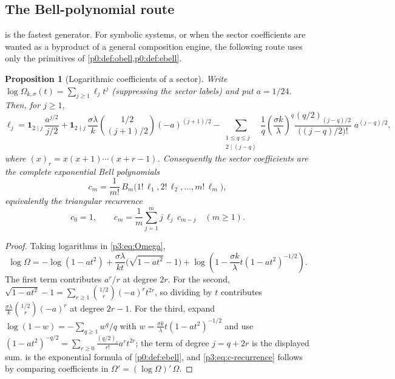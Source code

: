 \documentclass[11pt,a4paper,oneside]{book}
\theoremstyle{plain}
\newtheorem{proposition}[theorem]{Proposition}
\theoremstyle{definition}
\theoremstyle{remark}
\newcommand{\EB}{B}
\begin{document}
\subsection{The Bell-polynomial route}

 is the fastest generator. For symbolic systems, or when the sector
coefficients are wanted as a byproduct of a general composition engine, the following route uses
only the primitives of \cref{p0:def:obell,p0:def:ebell}.

\begin{proposition}[Logarithmic coefficients of a sector]\label{p3:prop:ell}
Write $\log\Omega_{k,\sigma}(t)=\sum_{j\ge1}\ell_{j}t^{j}$ (suppressing the sector labels) and put
$a=1/24$. Then, for $j\ge1$,
\begin{equation}\label{p3:eq:ell}
 \ell_{j}
 =\mathbf 1_{2\mid j}\,\frac{a^{j/2}}{j/2}
 +\mathbf 1_{2\nmid j}\,\frac{\sigma\lambda}{k}
   \binom{1/2}{(j+1)/2}(-a)^{(j+1)/2}
 -\sum_{\substack{1\le q\le j\\ 2\mid (j-q)}}\frac1q
   \left(\frac{\sigma k}{\lambda}\right)^{\!q}
   \frac{(q/2)_{(j-q)/2}}{\bigl((j-q)/2\bigr)!}\;a^{(j-q)/2},
\end{equation}
where $(x)_{r}=x(x+1)\cdots(x+r-1)$. Consequently the sector coefficients are the complete
exponential Bell polynomials
\begin{equation}\label{p3:eq:c-bell}
 c_{m}=\frac1{m!}\,\EB_{m}\bigl(1!\,\ell_{1},2!\,\ell_{2},\dots,m!\,\ell_{m}\bigr),
\end{equation}
equivalently the triangular recurrence
\begin{equation}\label{p3:eq:c-recurrence}
 c_{0}=1,\qquad c_{m}=\frac1m\sum_{j=1}^{m}j\,\ell_{j}\,c_{m-j}\quad(m\ge1).
\end{equation}
\end{proposition}

\begin{proof}
Taking logarithms in \cref{p3:eq:Omega},
\[
\log\Omega=-\log(1-at^{2}) +\frac{\sigma\lambda}{kt}\bigl(\sqrt{1-at^{2}}-1\bigr)
+\log\!\left(1-\frac{\sigma k}{\lambda}t(1-at^{2})^{-1/2}\right).
\]
The first term contributes $a^{r}/r$ at degree $2r$. For the second,
$\sqrt{1-at^{2}}-1=\sum_{r\ge1}\binom{1/2}{r}(-a)^{r}t^{2r}$, so dividing by $t$ contributes
$\frac{\sigma\lambda}{k}\binom{1/2}{r}(-a)^{r}$ at degree $2r-1$. For the third, expand
$\log(1-w)=-\sum_{q\ge1}w^{q}/q$ with $w=\frac{\sigma k}{\lambda}t(1-at^{2})^{-1/2}$ and use
$(1-at^{2})^{-q/2}=\sum_{r\ge0}\frac{(q/2)_{r}}{r!}a^{r}t^{2r}$; the term of degree $j=q+2r$ is
the displayed sum.  is the exponential formula of \cref{p0:def:ebell}, and
\cref{p3:eq:c-recurrence} follows by comparing coefficients in $\Omega'=(\log\Omega)'\,\Omega$.
\end{proof}
\end{document}

